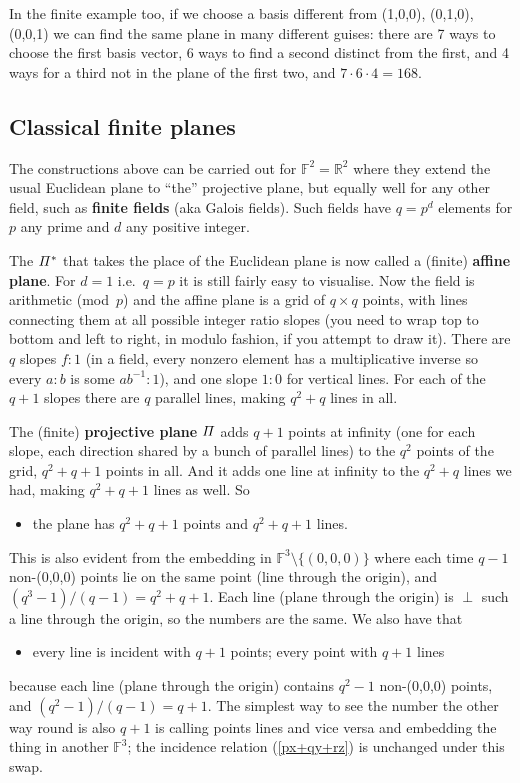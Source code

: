 \documentclass[12pt]{article}
\def\Rset{\mathbb{R}}
\def\Fset{\mathbb{F}}
\begin{document}
In the finite example too, if we choose a basis different from (1,0,0),
(0,1,0), (0,0,1) we can find the same plane in many different guises:
there are 7 ways to choose the first basis vector, 6 ways to find a
second distinct from the first, and 4 ways for a third not in the plane
of the first two, and $7\cdot6\cdot4=168$.

\clearpage
\subsection*{Classical finite planes}

The constructions above can be carried out for $\Fset^2=\Rset^2$ where they
extend the usual Euclidean plane to ``the'' projective plane, but equally
well for any other field, such as {\bf finite fields} (aka Galois fields).
Such fields have $q=p^d$ elements for $p$ any prime and $d$ any positive
integer.

The $\mit\Pi^*$ that takes the place of the Euclidean plane is now called a
(finite) {\bf affine plane}. For $d=1$ i.e.\ $q=p$ it is still fairly easy
to visualise. Now the field is arithmetic (mod~$p$) and the affine plane
is a grid of $q\times q$ points, with lines connecting them at all possible
integer ratio slopes (you need to wrap top to bottom and left to right,
in modulo fashion, if you attempt to draw it). There are $q$ slopes $f:1$
(in a field, every nonzero element has a multiplicative inverse so every $a:b$
is some $ab^{-1}:1$), and one slope $1:0$ for vertical lines. For each of the
$q+1$ slopes there are $q$ parallel lines, making $q^2+q$ lines in all.

The (finite) {\bf projective plane} $\mit\Pi$ adds $q+1$ {\sc point}s at infinity
(one for each slope, each direction shared by a bunch of parallel lines)
to the $q^2$ points of the grid, $q^2+q+1$ {\sc point}s in all. And it adds one
{\sc line} at infinity to the $q^2+q$ lines we had, making $q^2+q+1$ {\sc line}s as well.
So
%
\begin{itemize}

\item the plane has $q^2+q+1$ {\sc point}s and $q^2+q+1$ {\sc line}s.

\end{itemize}
%
This is also evident from the embedding in $\Fset^3 \setminus \{(0,0,0)\}$
where each time $q-1$ non-(0,0,0) points lie on the same {\sc point} (line through
the origin), and $(q^3-1)/(q-1) = q^2+q+1$. Each {\sc line} (plane through the
origin) is $\perp$ such a line through the origin, so the numbers are the
same. We also have that
%
\begin{itemize}

\item every {\sc line} is incident with $q+1$ {\sc point}s; every {\sc point} with $q+1$ {\sc line}s

\end{itemize}
%
because each {\sc line} (plane through the origin) contains $q^2-1$ non-(0,0,0)
points, and $(q^2-1)/(q-1) = q+1$. The simplest way to see the number the
other way round is also $q+1$ is calling {\sc point}s {\sc line}s and vice versa and
embedding the thing in another $\Fset^3$; the incidence relation
(\ref{px+qy+rz}) is unchanged under this swap.
\end{document}
